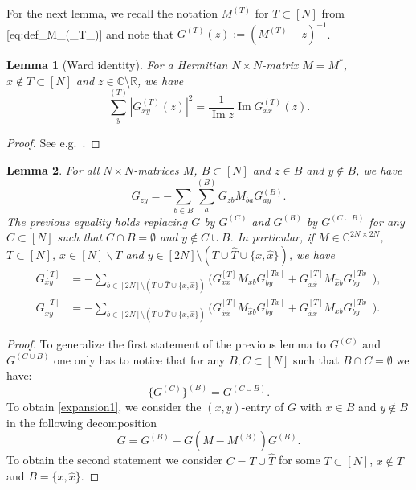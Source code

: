 \documentclass[11pt]{article}
\DeclareMathOperator{\Ima}{Im}
\newcommand{\R}{\mathbb{R}}
\newcommand{\C}{\mathbb{C}}
\theoremstyle{plain}
\newtheorem{lemma}{Lemma}[section]
\theoremstyle{remark}
\numberwithin{equation}{section}
\newcommand*\bset[1]{[#1]}
\newcommand*\ubarr[1]{{\widehat{#1}}}
\begin{document}
	For the next lemma, we recall the notation $M^{(T)}$ for $T \subset [N]$ from \cref{eq:def_M_(_T_)} and note that $G^{(T)}(z):= (M^{(T)} - z)^{-1}$. 
	\begin{lemma}[Ward identity]\label{lemma:wardidentity}
		For a Hermitian $N \times N$-matrix $M=M^*$, $x \notin T \subset [N]$ and $z \in \C \setminus \R$, we have
		\begin{equation}\label{eq:wardidentity}
			\sum_{y}^{(T)} |G_{xy}^{(T)}(z)|^2 = \frac{1}{\Ima z}\Ima G_{xx}^{(T)} (z).
		\end{equation}
	\end{lemma}
	
	\begin{proof}
		See e.g.\ \cite[Equation (3.6)]{benaych2016lectures}.
	\end{proof}
	\begin{lemma}
		For all $N\times N$-matrices $M$, $B \subset [N]$ and $z \in B $ and $y \notin B$, we have
		\begin{equation}\label{expansion1}
			G_{zy} = - \sum_{b \in B} \sum_{a}^{(B)} G_{zb} M_{ba} G_{ay}^{(B)}.
		\end{equation}
		The previous equality holds replacing $G$ by $G^{(C)}$ and $G^{(B)}$ by $G^{(C \cup B)}$ for any $C\subset [N]$ such that $C \cap B = \emptyset$ and $y \notin C \cup B$. In particular, if $M \in \C^{2N \times 2N}$, $T \subset [N]$, $x \in [N]\backslash T$ and $y\in [2N]\setminus (T \cup \ubarr{T} \cup \{ x, \ubarr{x}\})$,  we have
		\begin{align}
		G^{\bset{T}}_{xy} &= - \sum_{b \in [2N]\setminus (T \cup \ubarr{T} \cup \{ x, \ubarr{x}\})}  \Big( G_{xx}^{\bset{T}} M_{xb} G^{\bset{Tx}}_{by} + G^{\bset{T}}_{x \ubarr{x}}  M_{\ubarr{x} b} G^{\bset{Tx}}_{by} \Big), \label{eq:A29A}\\ 
			G^{\bset{T}}_{\ubarr{x}y} &= - \sum_{b \in [2N]\setminus (T \cup \ubarr{T} \cup \{ x, \ubarr{x}\})}  \Big( G_{\ubarr{x}\ubarr{x}}^{\bset{T}} M_{\ubarr{x}b} G^{\bset{Tx}}_{by} + G^{\bset{T}}_{\ubarr{x}x }  M_{x b} G^{\bset{Tx}}_{by} \Big). \label{eq:A29B}
		\end{align}
	\end{lemma}
	\begin{proof}
		To generalize the first statement of the previous lemma to $G^{(C)}$ and $G^{(C\cup B)}$ one only has to notice that for any $B,C \subset [N]$ such that $B \cap C = \emptyset$ we have:
		$$\{G^{(C)}\}^{(B)}= G^{(C\cup B)}.$$
		To obtain \eqref{expansion1}, we consider the $(x,y)$-entry of $G$ with $x \in B$ and $y \notin B$ in the following decomposition
		\begin{equation}\label{eq:resolv_identity}
			G= G^{(B)} - G \left(M - M^{(B)}\right) G^{(B)}.
		\end{equation}
		To obtain the second statement we consider  $C = T \cup \ubarr{T}$ for some $T \subset [N] $, $x \notin T$ and $B = \{x, \ubarr{x}\}$.
	\end{proof}
\end{document}
